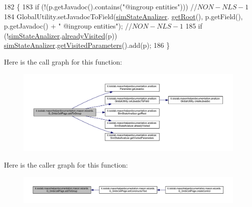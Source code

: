 \begin{DoxyCode}
182                                          \{
183         \textcolor{keywordflow}{if} (!(p.getJavadoc().contains(\textcolor{stringliteral}{"@ingroup entities"}))) \textcolor{comment}{//$NON-NLS-1$}
184             GlobalUtility.setJavadocToField(\hyperlink{classit_1_1isislab_1_1masonhelperdocumentation_1_1mason_1_1wizards_1_1_g___grids_cell_page_aadd93c2041dd8e74fd87a3a432504fa2}{simStateAnalizer}.
      \hyperlink{classit_1_1isislab_1_1masonhelperdocumentation_1_1analizer_1_1_sim_state_analizer_a87990fc6efb2a06013ff8489ede4dcdf}{getRoot}(), p.getField(), p.getJavadoc() + \textcolor{stringliteral}{" @ingroup entities"}); \textcolor{comment}{//$NON-NLS-1$}
185         \textcolor{keywordflow}{if} (!\hyperlink{classit_1_1isislab_1_1masonhelperdocumentation_1_1mason_1_1wizards_1_1_g___grids_cell_page_aadd93c2041dd8e74fd87a3a432504fa2}{simStateAnalizer}.\hyperlink{classit_1_1isislab_1_1masonhelperdocumentation_1_1analizer_1_1_sim_state_analizer_a384f244c6d532ff8120eb40868a97989}{alreadyVisited}(p))  
      \hyperlink{classit_1_1isislab_1_1masonhelperdocumentation_1_1mason_1_1wizards_1_1_g___grids_cell_page_aadd93c2041dd8e74fd87a3a432504fa2}{simStateAnalizer}.\hyperlink{classit_1_1isislab_1_1masonhelperdocumentation_1_1analizer_1_1_sim_state_analizer_a6a2c3cc8da53fb864eacebecfa5e7463}{getVisitedParameters}().add(p);     
186     \}
\end{DoxyCode}


Here is the call graph for this function\-:\nopagebreak
\begin{figure}[H]
\begin{center}
\leavevmode
\includegraphics[width=350pt]{classit_1_1isislab_1_1masonhelperdocumentation_1_1mason_1_1wizards_1_1_g___grids_cell_page_a43c0ab8367d25f1cfd0cdc9e29f46e5c_cgraph}
\end{center}
\end{figure}




Here is the caller graph for this function\-:\nopagebreak
\begin{figure}[H]
\begin{center}
\leavevmode
\includegraphics[width=350pt]{classit_1_1isislab_1_1masonhelperdocumentation_1_1mason_1_1wizards_1_1_g___grids_cell_page_a43c0ab8367d25f1cfd0cdc9e29f46e5c_icgraph}
\end{center}
\end{figure}


